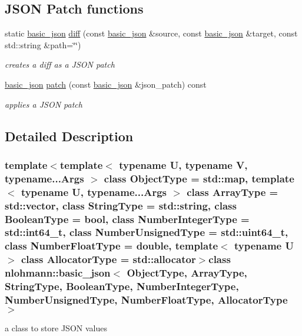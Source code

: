 \subsection*{J\+S\+O\+N Patch functions}
\begin{DoxyCompactItemize}
\item 
static \hyperlink{classnlohmann_1_1basic__json}{basic\+\_\+json} \hyperlink{classnlohmann_1_1basic__json_a5ef1934868b90452a4a34695489c60cd}{diff} (const \hyperlink{classnlohmann_1_1basic__json}{basic\+\_\+json} \&source, const \hyperlink{classnlohmann_1_1basic__json}{basic\+\_\+json} \&target, const std\+::string \&path=\char`\"{}\char`\"{})
\begin{DoxyCompactList}\small\item\em creates a diff as a J\+S\+O\+N patch \end{DoxyCompactList}\item 
\hyperlink{classnlohmann_1_1basic__json}{basic\+\_\+json} \hyperlink{classnlohmann_1_1basic__json_aa41e1083435cf317a253947eb1ff318d}{patch} (const \hyperlink{classnlohmann_1_1basic__json}{basic\+\_\+json} \&json\+\_\+patch) const 
\begin{DoxyCompactList}\small\item\em applies a J\+S\+O\+N patch \end{DoxyCompactList}\end{DoxyCompactItemize}


\subsection{Detailed Description}
\subsubsection*{template$<$template$<$ typename U, typename V, typename...\+Args $>$ class Object\+Type = std\+::map, template$<$ typename U, typename...\+Args $>$ class Array\+Type = std\+::vector, class String\+Type = std\+::string, class Boolean\+Type = bool, class Number\+Integer\+Type = std\+::int64\+\_\+t, class Number\+Unsigned\+Type = std\+::uint64\+\_\+t, class Number\+Float\+Type = double, template$<$ typename U $>$ class Allocator\+Type = std\+::allocator$>$class nlohmann\+::basic\+\_\+json$<$ Object\+Type, Array\+Type, String\+Type, Boolean\+Type, Number\+Integer\+Type, Number\+Unsigned\+Type, Number\+Float\+Type, Allocator\+Type $>$}

a class to store J\+S\+O\+N values 


